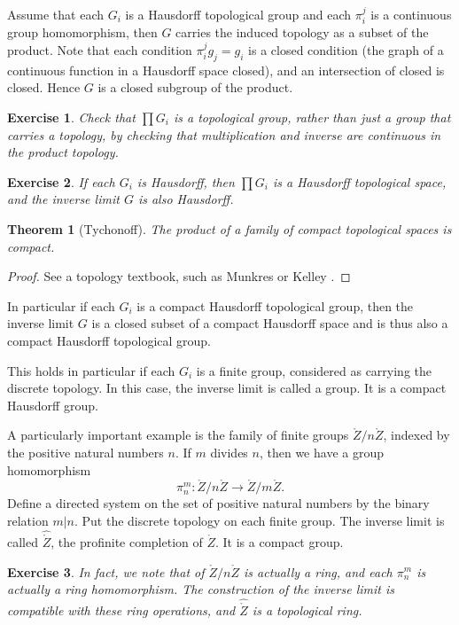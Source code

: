 \documentclass{amsart}
\newtheorem{theorem}[equation]{Theorem}
\newtheorem{exercise}{Exercise}
\begin{document}
Assume that each $G_i$ is a Hausdorff topological group and each
$\pi^j_i$ is a continuous group homomorphism, then $G$ carries the
induced topology as a subset of the product.  Note that each condition
$\pi^j_i g_j = g_i$ is a closed condition (the graph of a continuous
function in a Hausdorff space closed), and an intersection of closed
is closed.  Hence $G$ is a closed subgroup of the product.

\begin{exercise} Check that $\prod G_i$ is a topological group, rather
  than just a group that carries a topology, by checking that
  multiplication and inverse are continuous in the product topology.
\end{exercise}

\begin{exercise}
If each $G_i$ is Hausdorff, then $\prod G_i$ is a Hausdorff topological
space, and the inverse limit $G$ is also Hausdorff.
\end{exercise}

\begin{theorem}[Tychonoff]  The product of  a family of compact topological
spaces is compact.
\end{theorem}

\begin{proof} See a topology textbook, such as Munkres or Kelley \cite[page 143]{Kelley}.
\end{proof}

In particular if each $G_i$ is a compact Hausdorff topological group, then the inverse limit
$G$ is a closed subset of a compact Hausdorff space and is thus also
a compact Hausdorff topological group.

This holds in particular if each $G_i$ is a finite group, considered as carrying
the discrete topology.  In this case, the inverse limit is called a 
group.  It is a compact Hausdorff group.

A particularly important example is the family of finite groups $\ring{Z}/n\ring{Z}$,
indexed by the positive natural numbers $n$.  If $m$ divides $n$, then we have a group
homomorphism
\[
\pi^m_n:\ring{Z}/n\ring{Z} \to \ring{Z}/m\ring{Z}.
\]
Define a directed system on the set of positive natural numbers 
by the binary relation $m | n$.
Put the discrete topology on each finite group.
The inverse limit is called $\hat{\ring{Z}}$, the profinite completion of $\ring{Z}$.
It is a compact group.

\begin{exercise}
In fact, we note that of $\ring{Z}/n\ring{Z}$ is actually a ring, and each $\pi^m_n$
is actually a ring homomorphism.  The construction of the inverse limit is compatible
with these ring operations, and $\hat{\ring{Z}}$ is a topological ring.
\end{exercise}
\end{document}
